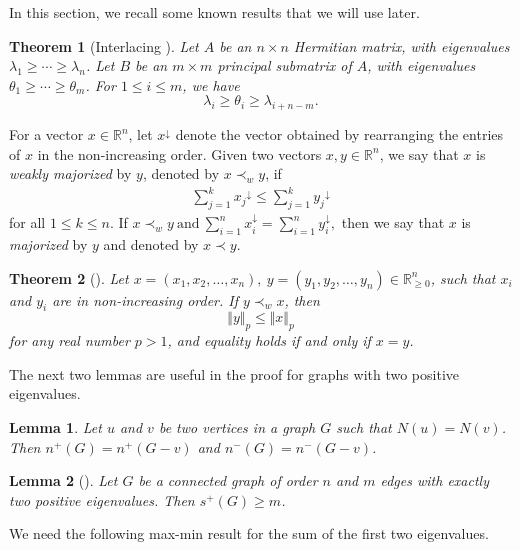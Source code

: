 \documentclass{article}
\newtheorem{theorem}{Theorem}[section]
\newtheorem{lemma}{Lemma}[section]
\begin{document}
In this section, we recall some known results that we will use later. 
 
\begin{theorem}[Interlacing \cite{Horn_Johnson_2013}]
    Let $A$ be an $n\times n$ Hermitian matrix, with eigenvalues $\lambda_1  \ge \cdots \ge \lambda_n$. Let $B$ be an $m\times m$ principal submatrix of $A$, with eigenvalues $\theta_1 \ge \cdots \ge \theta_m$. For $1\le i\le m$, we have 
    \[\lambda_i \ge \theta_i \ge \lambda_{i+n-m}.\]
\end{theorem}

For a vector $x \in \mathbb{R}^n$, let $x^\downarrow$ denote the vector obtained by rearranging the entries of $x$ in the non-increasing order. Given two vectors $x, y \in \mathbb{R}^n $, we say that  $x$ is \textit{weakly majorized} by $y$, denoted by $x \prec_w y$, if
\begin{gather*}
    \sum_{j=1}^{k} {x_j}^\downarrow \leq \sum_{j=1}^{k} {y_j}^\downarrow
\end{gather*}
for all $1 \leq k \leq n.$
If $x \prec_w y \ \text{and}  \ \sum_{i=1}^{n} x_i^\downarrow = \sum_{i=1}^{n} y_i^\downarrow,$
then we say that $x$ is \textit{majorized} by $y$ and denoted by $x \prec y$.

\begin{theorem}[\cite{Lin_Ning_Wu_2021_trianglefree}]
\label{thm:majorization}
    Let $x = (x_1,x_2,\dots,x_n),\ y = (y_1,y_2,\dots,y_n) \in \mathbb{R}^n_{\geq 0}$, such that $x_i$ and $y_i$ are in non-increasing order. If $y \prec_w x$, then 
    \[\Vert y\Vert_p \leq \Vert x\Vert_p\]
    for any real number $p> 1$, and equality holds if and only if $x=y$.
\end{theorem}

The next two lemmas are useful in the proof for graphs with two positive eigenvalues. 

\begin{lemma}\label{lemma:inertia} Let $u$ and $v$ be two vertices in a graph $G$ such that $N(u)=N(v)$. Then $n^+(G)=n^+(G-v)$ and $n^-(G)=n^-(G-v)$.
\end{lemma}

\begin{lemma}[\cite{Aida_2023}]\label{lemma:two_positive_eigs}
    Let $G$ be a connected graph of order $n$ and $m$ edges with exactly two positive eigenvalues. Then $s^+(G) \ge m$.
\end{lemma}

We need the following max-min result for the sum of the first two eigenvalues. 
\end{document}
